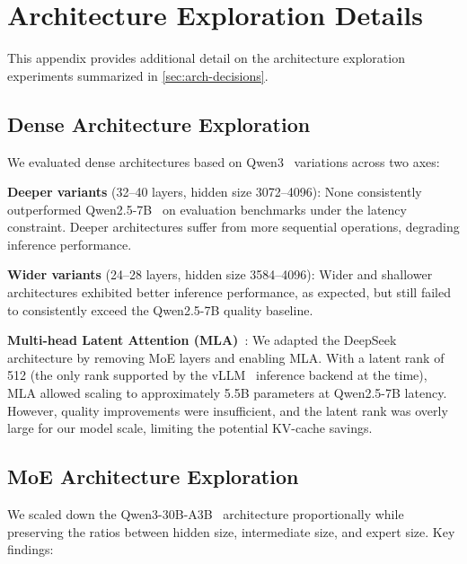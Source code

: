 \documentclass{llmxive}
\begin{document}
\appendix

\section{Architecture Exploration Details}
\label{app:arch-exploration}

This appendix provides additional detail on the architecture exploration
experiments summarized in \cref{sec:arch-decisions}.

\subsection{Dense Architecture Exploration}

We evaluated dense architectures based on Qwen3~\cite{yang2025qwen3} variations across two axes:

\textbf{Deeper variants} (32--40 layers, hidden size 3072--4096): None
consistently outperformed Qwen2.5-7B~\cite{qwen2.5} on evaluation benchmarks under the
latency constraint. Deeper architectures suffer from more sequential
operations, degrading inference performance.

\textbf{Wider variants} (24--28 layers, hidden size 3584--4096): Wider and
shallower architectures exhibited better inference performance, as expected,
but still failed to consistently exceed the Qwen2.5-7B quality baseline.

\textbf{Multi-head Latent Attention (MLA)}~\cite{deepseekai2024deepseekv2}: We adapted the DeepSeek
architecture by removing MoE layers and enabling MLA. With a latent rank of
512 (the only rank supported by the vLLM~\cite{kwon2023vllm} inference backend at the time), MLA
allowed scaling to approximately 5.5B parameters at Qwen2.5-7B latency.
However, quality improvements were insufficient, and the latent rank was
overly large for our model scale, limiting the potential KV-cache savings.

\subsection{MoE Architecture Exploration}

We scaled down the Qwen3-30B-A3B~\cite{yang2025qwen3} architecture proportionally while preserving
the ratios between hidden size, intermediate size, and expert size. Key
findings:
\end{document}
